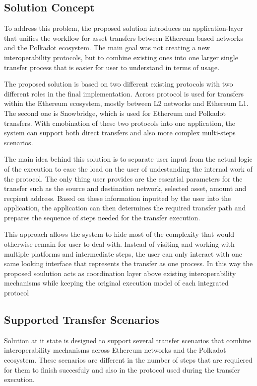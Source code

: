 \documentclass[conference]{IEEEtran}
\begin{document}
\subsection{Solution Concept}
To address this problem, the proposed solution introduces an application-layer that unifies the workflow for asset transfers  between Ethereum based networks and the Polkadot ecosystem. The main goal was not creating a new interoperability protocols, but to combine existing ones into one larger single transfer process that is easier for user to understand in terms of usage.

The proposed solution is based on two different existing protocols with two different roles in the final implementation. Across protocol is used for transfers within the Ethereum ecosystem, mostly between L2 networks and Ethereum L1. The second one is Snowbridge, which is used for Ethereum and Polkadot transfers. With cmobination of these two protocols into one application, the system can support both direct transfers and also more complex multi-steps scenarios.

The main idea behind this solution is to separate user input from the actual logic of the execution to ease the load on the user of undestanding the internal work of the protocol. The only thing user provides are the essential parameters for the transfer such as the source and destination network, selected asset, amount and recpient address. Based on these information inputted by the user into the application, the application can then determines the  required transfer path and prepares the sequence of steps needed for the transfer execution.

This approach allows the system to hide most of the complexity that would otherwise remain for user to deal with. Instead of visiting and working with multiple platforms and intermediate steps, the user can only interact with one same looking interface that represents the transfer as one process. In this way the proposed soulution acts as coordination layer above existing interoperability mechanisms while keeping the original execution model of each integrated protocol


\subsection{Supported Transfer Scenarios}

Solution at it state is designed to support several transfer scenarios that combine interoperability mechanisms across Ethereum networks and the Polkadot ecosystem. These scenarios are different in the number of steps that are requiered for them to finish succesfuly and also in the protocol used during the transfer execution.
\end{document}

